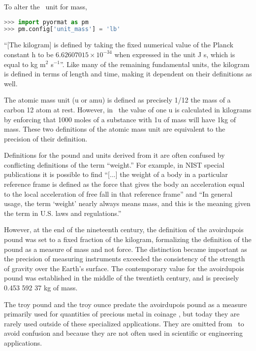 To alter the \PM\ unit for mass,
\begin{lstlisting}[language=Python]
>>> import pyormat as pm
>>> pm.config['unit_mass'] = 'lb'
\end{lstlisting}

``[The kilogram] is defined by taking the fixed numerical value of the Planck constant h to be $6.62607015\times 10^{-34}$ when expressed in the unit J s, which is equal to kg m$^2$ s$^{-1}$''\cite[p.131]{si:2019}.  Like many of the remaining fundamental units, the kilogram is defined in terms of length and time, making it dependent on their definitions as well.

The atomic mass unit (u or amu) is defined as precisely 1/12 the mass of a carbon 12 atom at rest.  However, in \PM\ the value of one u is calculated in kilograms by enforcing that 1000 moles of a substance with 1u of mass will have 1kg of mass.  These two definitions of the atomic mass unit are equivalent to the precision of their definition\cite[p.146]{si:2019}.

Definitions for the pound and units derived from it are often confused by conflicting definitions of the term ``weight.''  For example, in NIST special publications it is possible to find ``[...] the  weight  of  a  body  in  a  particular  reference  frame  is  defined  as  the  force that gives the body an acceleration equal to the local acceleration of free fall in that reference frame''\cite[p.23]{nist:sp811} and ``In general usage, the term `weight' nearly always means mass, and this is the meaning given the term in U.S. laws and regulations.'' \cite[p.10]{nist:sp1038}

However, at the end of the nineteenth century, the definition of the avoirdupois pound was set to a fixed fraction of the kilogram, formalizing the definition of the pound as a measure of mass and not force.  The distinction became important as the precision of measuring instruments exceeded the consistency of the strength of gravity over the Earth's surface.  The contemporary value for the avoirdupois pound was established in the middle of the twentieth century, and is precisely 0.453 592 37 kg of mass.\cite{nbs:1959}

The troy pound and the troy ounce predate the avoirdupois pound as a measure primarily used for quantities of precious metal in coinage \cite[p.6]{nbs:sp447}, but today they are rarely used outside of these specialized applications.  They are omitted from \PM\ to avoid confusion and because they are not often used in scientific or engineering applications.

